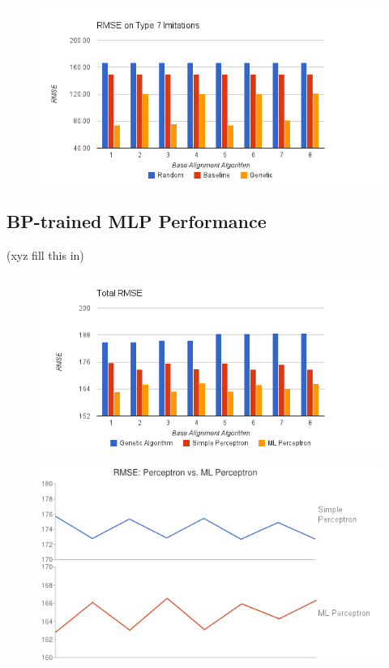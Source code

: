 \begin{figure}[center]
	\centering
	\includegraphics[width=16cm]{images/chart5.png}
	\caption{}
	\label{fig:c7}
\end{figure}


\subsection{BP-trained MLP Performance}
(xyz fill this in)
\begin{figure}[center]
	\centering
	\includegraphics[width=16cm]{images/chart4.png}
	\caption{}
	\label{fig:overall_ml}
\end{figure}

\begin{figure}[center]
	\centering
	\includegraphics[width=12cm]{images/chart10.png}
	\caption{}
	\label{fig:perceptron_vs_bp}
\end{figure}

